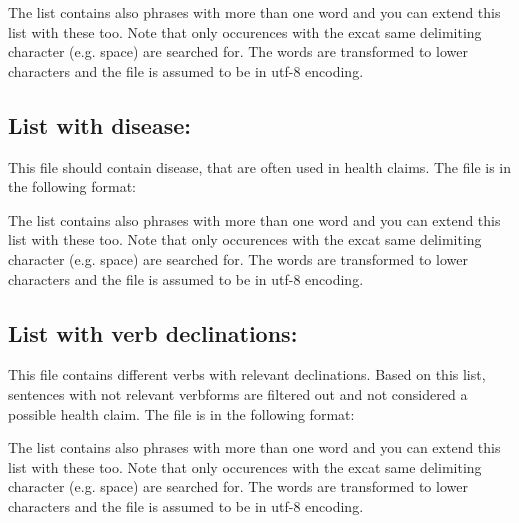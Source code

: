 \documentclass[letterpaper,10pt,english]{sphinxmanual}
\begin{document}
The list contains also phrases with more than one word and you can
extend this list with these too. Note that only occurences with the
excat same delimiting character (e.g. space) are searched for. The
words are transformed to lower characters and the file is assumed to
be in utf-8 encoding.


\subsection{List with disease:}
\label{\detokenize{online_learning:diseases-online}}\label{\detokenize{online_learning:list-with-disease}}
This file should contain disease, that are often used in health
claims. The file is in the following format:

%
\begin{sphinxVerbatim}[commandchars=\\\{\}]
 
\end{sphinxVerbatim}

The list contains also phrases with more than one word and you can
extend this list with these too. Note that only occurences with the
excat same delimiting character (e.g. space) are searched for. The
words are transformed to lower characters and the file is assumed to
be in utf-8 encoding.


\subsection{List with verb declinations:}
\label{\detokenize{online_learning:declination-online}}\label{\detokenize{online_learning:list-with-verb-declinations}}
This file contains different verbs with relevant declinations. Based
on this list, sentences with not relevant verbforms are filtered out
and not considered a possible health claim. The file is in the
following format:

%
\begin{sphinxVerbatim}[commandchars=\\\{\}]
 
\end{sphinxVerbatim}

The list contains also phrases with more than one word and you can
extend this list with these too. Note that only occurences with the
excat same delimiting character (e.g. space) are searched for. The
words are transformed to lower characters and the file is assumed to
be in utf-8 encoding.
\end{document}

